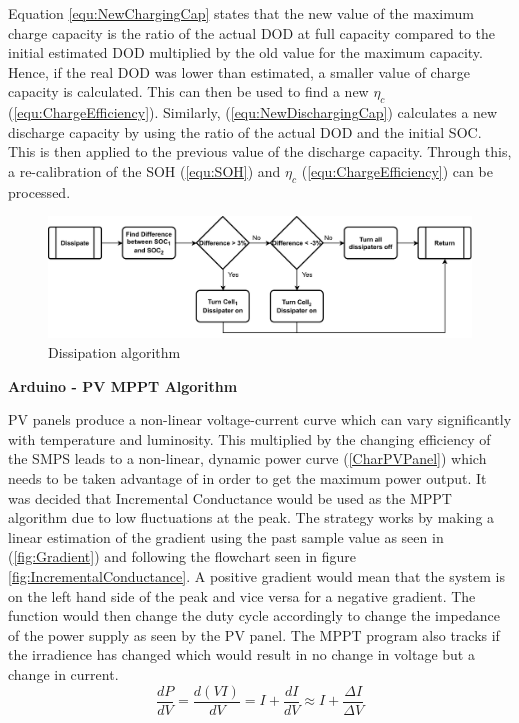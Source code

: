 \documentclass[10pt,twoside]{article}
\begin{document}
Equation \ref{equ:NewChargingCap} states that the new value of the maximum charge capacity is the ratio of the actual DOD at full capacity compared to the initial estimated DOD multiplied by the old value for the maximum capacity. Hence, if the real DOD was lower than estimated, a smaller value of charge capacity is calculated. This can then be used to find a new $\eta_c$ (\ref{equ:ChargeEfficiency}). Similarly, (\ref{equ:NewDischargingCap}) calculates a new discharge capacity by using the ratio of the actual DOD and the initial SOC. This is then applied to the previous value of the discharge capacity. Through this, a re-calibration of the SOH (\ref{equ:SOH}) and $\eta_c$ (\ref{equ:ChargeEfficiency}) can be processed.
\begin{figure}[hbt!]
    \centering
    \includegraphics[scale = 0.7]{Dissipate (3).pdf}
    \caption{Dissipation algorithm}
    \label{fig:DisAlgorithm}
\end{figure}

\textbf{Arduino - PV MPPT Algorithm}

PV panels produce a non-linear voltage-current curve which can vary significantly with temperature and luminosity. This multiplied by the changing efficiency of the SMPS leads to a non-linear, dynamic power curve (\ref{CharPVPanel}) which needs to be taken advantage of in order to get the maximum power output. It was decided that Incremental Conductance  would be used as the MPPT algorithm due to low fluctuations at the peak. The strategy works by making a linear estimation of the gradient using the past sample value as seen in (\ref{fig:Gradient}) and following the flowchart seen in figure \ref{fig:IncrementalConductance}. A positive gradient would mean that the system is on the left hand side of the peak and vice versa for a negative gradient. The function would then change the duty cycle accordingly to change the impedance of the power supply as seen by the PV panel. The MPPT program also tracks if the irradience has changed which would result in no change in voltage but a change in current. 
\begin{equation}
    \frac{dP}{dV} = \frac{d(VI)}{dV} = I + \frac{dI}{dV} \approx I + \frac{\Delta I}{\Delta V}
    \label{fig:Gradient}
\end{equation}
\end{document}
